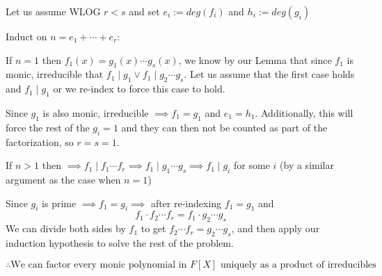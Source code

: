 \documentclass[11pt]{article}
\begin{document}
{    Let us assume WLOG $r < s$ and set $e_i := deg(f_i)$ and $h_i := deg(g_i)$

    Induct on $n = e_1 + \cdots + e_r$:

    If $n = 1$ then $f_1(x) = g_1(x) \cdots g_s(x)$, we know by our Lemma that since $f_1$ is monic, irreducible that $f_1 \mid g_1 \lor f_1 \mid g_2 \cdots g_s$. Let us assume that the first case holds and $f_1 \mid g_1$ or we re-index to force this case to hold.

    Since $g_1$ is also monic, irreducible $\implies f_1 = g_1$ and $e_1 = h_1$. Additionally, this will force the rest of the $g_i = 1$ and they can then not be counted as part of the factorization, so $r = s = 1$.

    If $n > 1$ then $\implies f_1 \mid f_1 \cdots f_r \implies f_1 \mid g_1 \cdots g_s \implies f_1 \mid g_i$ for some $i$ (by a similar argument as the case when $n = 1$)

    Since $g_i$ is prime $\implies f_1 = g_i \implies$ after re-indexing $f_1 = g_1$ and
    $$f_1 \cdot f_2 \cdots f_r = f_1 \cdot g_2 \cdots g_s$$
    We can divide both sides by $f_1$ to get $f_2 \cdots f_r = g_2 \cdots g_s$, and then apply our induction hypothesis to solve the rest of the problem.

    $$\therefore \text{We can factor every monic polynomial in $F[X]$ uniquely as a product of irreducibles}$$
}
\end{document}
